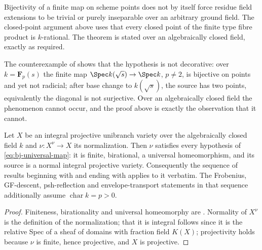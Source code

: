 \begin{remark}
\label{rem:ch43-where-algebraically-closed}
Bijectivity of a finite map on scheme points does not by itself force residue
field extensions to be trivial or purely inseparable over an arbitrary
ground field.
The closed-point argument above uses that every closed point of the finite
type fibre product is $k$-rational.
The theorem is stated over an algebraically closed field, exactly as required.

The counterexample of  shows that the
hypothesis is not decorative: over $k=\mathbf F_p(s)$ the finite map
$\Spec k(\sqrt s)\to\Spec k$, $p\ne2$, is bijective on points and yet
not radicial; after base change to $k(\sqrt s)$, the source has two points,
equivalently the diagonal is not surjective.
Over an algebraically closed field the phenomenon cannot occur, and the
proof above is exactly the observation that it cannot.
\end{remark}

\begin{corollary}
\label{cor:ch43-normalization-package}
Let $X$ be an integral projective unibranch variety over the algebraically
closed field $k$ and $\nu:X^\nu\to X$ its normalization.  Then
$\nu$ satisfies every hypothesis of \eqref{eq:bj-universal-map}: it is
finite, birational, a universal homeomorphism, and its source is a normal
integral projective variety.  Consequently
the sequence of results beginning with
 and ending with
 applies to it verbatim.  The Frobenius,
GF-descent, psh-reflection and envelope-transport statements in that sequence
additionally assume $\operatorname{char}k=p>0$.
\end{corollary}

\begin{proof}
Finiteness, birationality and universal homeomorphy are
.  Normality of $X^\nu$ is
the definition of the normalization; that it is integral follows since it
is the relative Spec of a sheaf of domains with fraction field $K(X)$;
projectivity holds because $\nu$ is finite, hence projective, and $X$ is
projective.
\end{proof}

